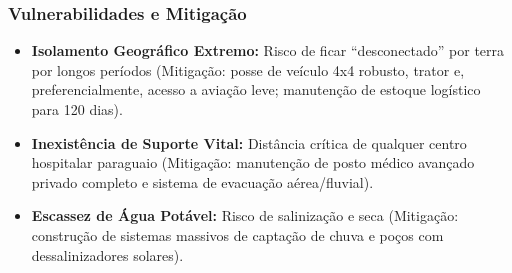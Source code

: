 \subsubsection{Vulnerabilidades e
Mitigação}

\begin{itemize}
\tightlist
\item
  \textbf{Isolamento Geográfico Extremo:} Risco de ficar
  ``desconectado'' por terra por longos períodos (Mitigação: posse de
  veículo 4x4 robusto, trator e, preferencialmente, acesso a aviação
  leve; manutenção de estoque logístico para 120 dias).
\item
  \textbf{Inexistência de Suporte Vital:} Distância crítica de qualquer
  centro hospitalar paraguaio (Mitigação: manutenção de posto médico
  avançado privado completo e sistema de evacuação aérea/\allowbreak fluvial).
\item
  \textbf{Escassez de Água Potável:} Risco de salinização e seca
  (Mitigação: construção de sistemas massivos de captação de chuva e
  poços com dessalinizadores solares).
\end{itemize}

